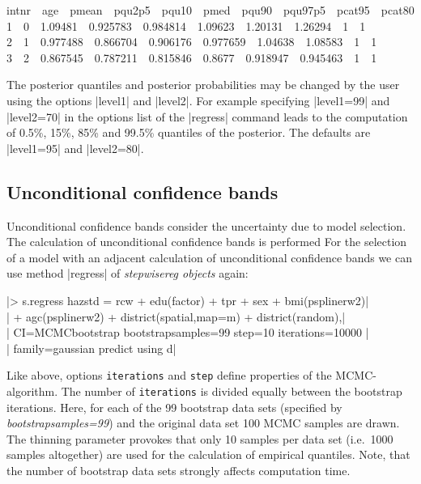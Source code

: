 {\footnotesize
 intnr \,\, age \,\, pmean \,\, pqu2p5 \,\, pqu10 \,\, pmed \,\, pqu90 \,\, pqu97p5 \,\, pcat95 \,\, pcat80\\
1 \,\,  0 \,\,  1.09481 \,\,  0.925783 \,\,  0.984814  \,\, 1.09623  \,\, 1.20131  \,\, 1.26294 \,\,  1 \,\,  1 \\
2 \,\,  1 \,\,  0.977488 \,\,  0.866704 \,\,  0.906176 \,\,  0.977659  \,\, 1.04638  \,\, 1.08583 \,\,  1 \,\,  1 \\
3 \,\,  2 \,\,  0.867545 \,\,  0.787211 \,\,  0.815846 \,\,  0.8677 \,\,  0.918947 \,\,  0.945463 \,\,  1 \,\,  1}

The posterior quantiles and posterior probabilities may be changed by the user using the options |level1| and |level2|. For
example specifying |level1=99| and |level2=70| in the options list of the |regress| command leads to the computation of 0.5\%,
15\%, 85\% and 99.5\% quantiles of the posterior. The defaults are |level1=95| and |level2=80|.


\subsection{Unconditional confidence bands}\label{step:uncond}

Unconditional confidence bands consider the uncertainty due to model selection. The calculation of unconditional confidence
bands is performed For the selection of a model with an adjacent calculation of unconditional confidence bands we can use
method |regress| of {\it stepwisereg objects} again:

 |> s.regress hazstd = rcw + edu(factor) + tpr + sex + bmi(psplinerw2)|\\
 |  + agc(psplinerw2) + district(spatial,map=m) + district(random),|\\
 |  CI=MCMCbootstrap bootstrapsamples=99 step=10 iterations=10000 |\\
 |  family=gaussian predict using d|

Like above, options {\tt iterations} and {\tt step} define properties of the MCMC-algorithm. The number of {\tt iterations} is
divided equally between the bootstrap iterations. Here, for each of the 99 bootstrap data sets (specified by {\it
bootstrapsamples=99}) and the original data set 100 MCMC samples are drawn. The thinning parameter provokes that only 10
samples per data set (i.e.~1000 samples altogether) are used for the calculation of empirical quantiles. Note, that the number
of bootstrap data sets strongly affects computation time.


